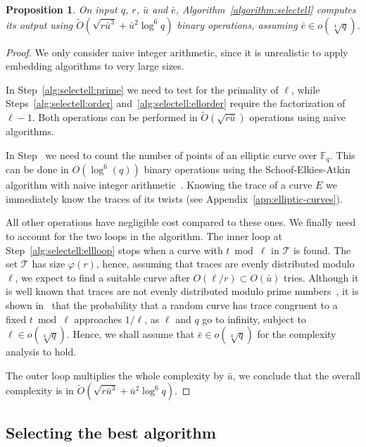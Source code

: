 \documentclass[12pt]{article}
\theoremstyle{plain}
\newtheorem{proposition}[theorem]{Proposition}
\theoremstyle{definition}
\newcommand{\tildO}{\tilde{O}}
\def\F{\ensuremath{\mathbb{F}}}
\def\euler{\ensuremath{\varphi}}
\newcounter{algorithm}
\begin{document}
\begin{proposition}
  On input $q$, $r$, $\bar{u}$ and $\bar{e}$,
  Algorithm~\ref{algorithm:selectell} computes its output using
  $\tildO\left(\sqrt{r\bar{u}^3} + \bar{u}^2\log^6{q}\right)$ binary
  operations, assuming $\bar{e}\in o(\sqrt[4]{q})$.
\end{proposition}
\begin{proof}
  We only consider naive integer arithmetic, since it is unrealistic
  to apply embedding algorithms to very large sizes.

  In Step~\ref{alg:selectell:prime} we need to test for the primality
  of $\ell$, while Steps~\ref{alg:selectell:order}
  and~\ref{alg:selectell:ellorder} require the factorization of
  $\ell-1$. Both operations can be performed in
  $\tildO(\sqrt{r\bar{u}})$ operations using naive algorithms.

  In Step~\label{alg:selectell:ellcount} we need to count the number
  of points of an elliptic curve over $\F_q$. This can be done in
  $O\left(\log^6(q)\right)$ binary operations using the
  Schoof-Elkies-Atkin algorithm with naive integer
  arithmetic~\cite{schoof95,lercier+sirvent08}. Knowing the trace of a
  curve $E$ we immediately know the traces of its twists (see
  Appendix~\ref{app:elliptic-curves}).

  All other operations have negligible cost compared to these ones. We
  finally need to account for the two loops in the algorithm. The
  inner loop at Step~\ref{alg:selectell:ellloop} stops when a curve
  with $t\bmod\ell$ in $\mathcal{T}$ is found. The set $\mathcal{T}$
  has size $\euler(r)$, hence, assuming that traces are evenly
  distributed modulo $\ell$, we expect to find a suitable curve after
  $O(\ell/r)\subset O(\bar{u})$ tries. Although it is well known that
  traces are not evenly distributed modulo prime
  numbers~\cite{lenstra87}, it is shown
  in~\cite[Th.~1]{castryck+hubrechts13} that the probability that a
  random curve has trace congruent to a fixed $t\bmod\ell$ approaches
  $1/\ell$, as $\ell$ and $q$ go to infinity, subject to $\ell\in
  o(\sqrt[4]{q})$. Hence, we shall assume that $\bar{e}\in
  o(\sqrt[4]{q})$ for the complexity analysis to hold.

  The outer loop multiplies the whole complexity by $\bar{u}$, we
  conclude that the overall complexity is in
  $\tildO\left(\sqrt{r\bar{u}^3} + \bar{u}^2\log^6{q}\right)$.
\end{proof}


\subsection{Selecting the best algorithm}
\end{document}
